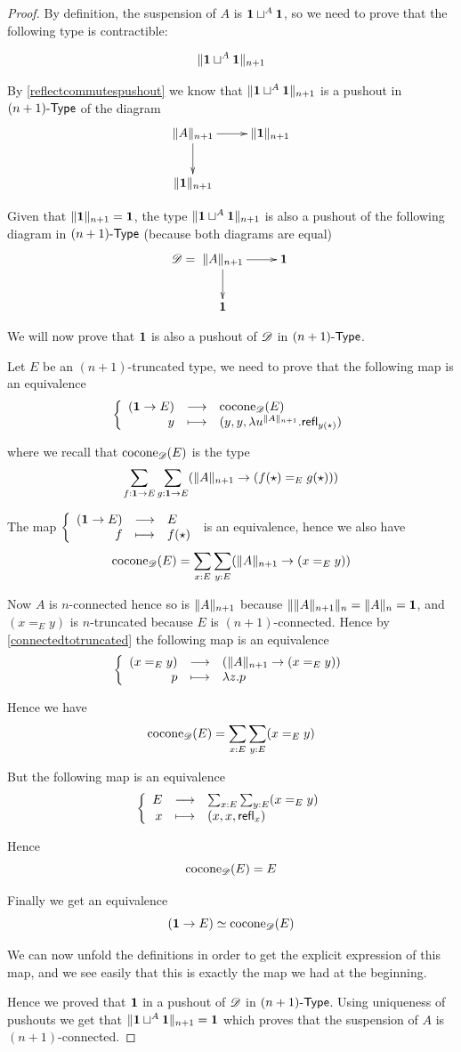 \begin{proof}
  By definition, the suspension of $A$ is $\unit\sqcup^A\unit$, so we need to
  prove that the following type is contractible:

  \[\trunc{n+1}{\unit\sqcup^A\unit}\]

  By \autoref{reflectcommutespushout} we know that
  $\trunc{n+1}{\unit\sqcup^A\unit}$ is a pushout in $\typelep{n+1}$ of the diagram
  \[\xymatrix{\trunc{n+1}A \ar[d] \ar[r] & \trunc{n+1}{\unit} \\
    \trunc{n+1}{\unit} & }\]

  Given that $\trunc{n+1}{\unit}=\unit$, the type
  $\trunc{n+1}{\unit\sqcup^A\unit}$ is also a pushout of the following diagram in
  $\typelep{n+1}$ (because both diagrams are equal)
  \[\Ddiag=\xymatrix{\trunc{n+1}A \ar[d] \ar[r] & \unit \\
    \unit & }\]

  We will now prove that $\unit$ is also a pushout of $\Ddiag$ in
  $\typelep{n+1}$.

  \bigskip

  Let $E$ be an $(n+1)$-truncated type, we need to prove that the following map
  is an equivalence
  \[\function{(\unit\to{}E)}{\cocone{\Ddiag}{E}}{y}
  {(y,y,\lambda{}u^{\trunc{n+1}A}.\refl{y(\ttt)})}\]

  where we recall that $\cocone{\Ddiag}{E}$ is the type
  \[\sum_{f:\unit\to{}E}\sum_{g:\unit\to{}E}(\trunc{n+1}A\to
  (f(\ttt)=_E{}g(\ttt)))\]

  The map $\function{(\unit\to{}E)}{E}{f}{f(\ttt)}$ is an equivalence, hence
  we also have
  \[\cocone{\Ddiag}{E}=\sum_{x:E}\sum_{y:E}(\trunc{n+1}A\to(x=_Ey))\]

  Now $A$ is $n$-connected hence so is $\trunc{n+1}A$ because
  $\trunc n{\trunc{n+1}A}=\trunc nA=\unit$, and $(x=_Ey)$ is $n$-truncated because
  $E$ is $(n+1)$-connected. Hence by \autoref{connectedtotruncated} the
  following map is an equivalence
  \[\function{(x=_Ey)}{(\trunc{n+1}A\to(x=_Ey))}{p}{\lambda{}z.p}\]

  Hence we have
  \[\cocone{\Ddiag}{E}=\sum_{x:E}\sum_{y:E}(x=_Ey)\]

  But the following map is an equivalence
  \[\function{E}{\sum_{x:E}\sum_{y:E}(x=_Ey)}{x}{(x,x,\refl{x})}\]

  Hence
  \[\cocone{\Ddiag}{E}=E\]

  Finally we get an equivalence
  \[(\unit\to{}E)\simeq\cocone{\Ddiag}{E}\]

  We can now unfold the definitions in order to get the explicit expression of
  this map, and we see easily that this is exactly the map we had at the
  beginning.

  \bigskip

  Hence we proved that $\unit$ in a pushout of $\Ddiag$ in $\typelep{n+1}$. Using
  uniqueness of pushouts we get that $\trunc{n+1}{\unit\sqcup^A\unit}=\unit$
  which proves that the suspension of $A$ is $(n+1)$-connected.
\end{proof}

